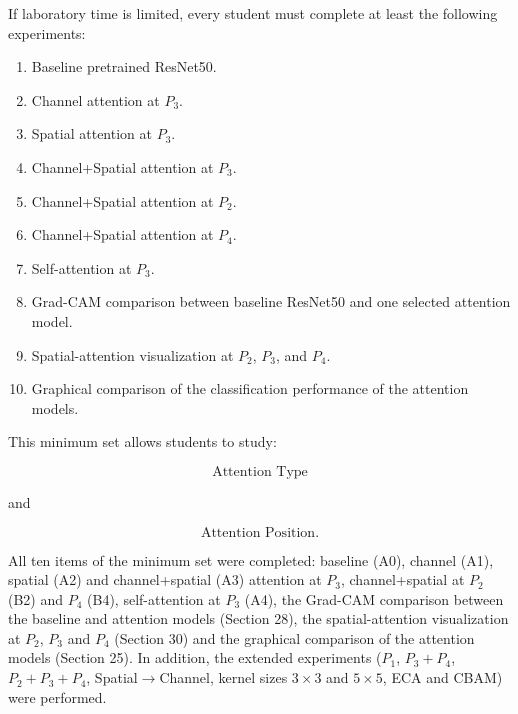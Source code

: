 \documentclass[10pt]{article}
\begin{document}
If laboratory time is limited, every student must complete at least the
following experiments:

\begin{enumerate}

\item Baseline pretrained ResNet50.

\item Channel attention at $P_3$.

\item Spatial attention at $P_3$.

\item Channel+Spatial attention at $P_3$.

\item Channel+Spatial attention at $P_2$.

\item Channel+Spatial attention at $P_4$.

\item Self-attention at $P_3$.

\item Grad-CAM comparison between baseline ResNet50 and one selected
attention model.

\item Spatial-attention visualization at $P_2$, $P_3$, and $P_4$.

\item Graphical comparison of the classification performance of the attention
models.

\end{enumerate}

This minimum set allows students to study:

\[
\boxed{\text{Attention Type}}
\]

and

\[
\boxed{\text{Attention Position}}.
\]


All ten items of the minimum set were completed: baseline (A0), channel (A1), spatial (A2) and channel+spatial (A3) attention at $P_3$, channel+spatial at $P_2$ (B2) and $P_4$ (B4), self-attention at $P_3$ (A4),
the Grad-CAM comparison between the baseline and attention models (Section 28), the spatial-attention visualization at $P_2$, $P_3$ and $P_4$ (Section 30) and the graphical comparison of the attention models (Section 25). In addition, the extended experiments
($P_1$, $P_3+P_4$, $P_2+P_3+P_4$, Spatial$\rightarrow$Channel, kernel sizes $3\times3$ and $5\times5$, ECA and CBAM) were performed.

\end{document}
